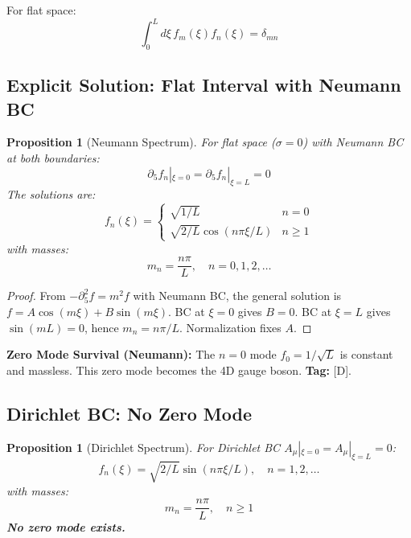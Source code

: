 \documentclass[11pt,a4paper]{article}
\newtheorem{proposition}[theorem]{Proposition}
\begin{document}
For flat space:
\begin{equation}
  \int_0^L d\xi \, f_m(\xi) f_n(\xi) = \delta_{mn}
  \label{eq:orthonormality-flat}
\end{equation}

\subsection{Explicit Solution: Flat Interval with Neumann BC}

\begin{proposition}[Neumann Spectrum]
\label{prop:neumann-spectrum}
For flat space ($\sigma = 0$) with Neumann BC at both boundaries:
\begin{equation}
  \partial_5 f_n|_{\xi=0} = \partial_5 f_n|_{\xi=L} = 0
  \label{eq:neumann-bc}
\end{equation}
The solutions are:
\begin{equation}
  f_n(\xi) = \begin{cases}
    \sqrt{1/L} & n = 0 \\
    \sqrt{2/L} \cos(n\pi\xi/L) & n \geq 1
  \end{cases}
  \label{eq:neumann-modes}
\end{equation}
with masses:
\begin{equation}
  m_n = \frac{n\pi}{L}, \quad n = 0, 1, 2, \ldots
  \label{eq:neumann-masses}
\end{equation}
\end{proposition}

\begin{proof}
From $-\partial_5^2 f = m^2 f$ with Neumann BC, the general solution is
$f = A\cos(m\xi) + B\sin(m\xi)$. BC at $\xi=0$ gives $B=0$. BC at $\xi=L$ gives
$\sin(mL) = 0$, hence $m_n = n\pi/L$. Normalization fixes $A$.
\end{proof}

\begin{resultbox}
\textbf{Zero Mode Survival (Neumann):} The $n=0$ mode $f_0 = 1/\sqrt{L}$ is
constant and massless. This zero mode becomes the 4D gauge boson.
\textbf{Tag:} [D].
\end{resultbox}

\subsection{Dirichlet BC: No Zero Mode}

\begin{proposition}[Dirichlet Spectrum]
\label{prop:dirichlet-spectrum}
For Dirichlet BC $A_\mu|_{\xi=0} = A_\mu|_{\xi=L} = 0$:
\begin{equation}
  f_n(\xi) = \sqrt{2/L} \sin(n\pi\xi/L), \quad n = 1, 2, \ldots
  \label{eq:dirichlet-modes}
\end{equation}
with masses:
\begin{equation}
  m_n = \frac{n\pi}{L}, \quad n \geq 1
  \label{eq:dirichlet-masses}
\end{equation}
\textbf{No zero mode exists.}
\end{proposition}
\end{document}
